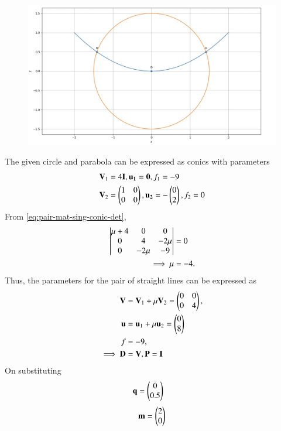 	\begin{figure}[!h]
		\centering
 \includegraphics[width=\columnwidth]{chapters/12/8/2/1/figs/conic.jpg}
		\caption{}
		\label{fig:12/8/2/1}
  	\end{figure}
The given circle and parabola can be expressed as conics with parameters 
\begin{align}
	\mathbf{V}_1&=4\mathbf{I},
\mathbf{u_1}=\mathbf{0},
f_1=-9
\\
	\mathbf{V}_2&=\begin{pmatrix}
1 & 0\\
0 & 0
\end{pmatrix},
\mathbf{u_2}= -\begin{pmatrix}
0\\
2
\end{pmatrix},
f_2=0
\end{align} 
	  From \eqref{eq:pair-mat-sing-conic-det},
\begin{align}
\begin{vmatrix}\mu+4 & 0 & 0\\ 
0 & 4 & -2\mu \\
0 & -2\mu & -9
\end{vmatrix} &= 0
\\
	\implies   \mu &= -4.
\end{align}
 Thus, the parameters for the pair of  straight lines can be expressed as 
 \begin{align}
	\mathbf{V} &= 
\mathbf{V}_1 + \mu\mathbf{V}_2
=\begin{pmatrix} 0 & 0 \\ 0 & 4\end{pmatrix},
\\
	\mathbf{u} &=
\mathbf{u}_1+\mu \mathbf{u}_2
	= \begin{pmatrix}
0\\
8
    \end{pmatrix}
\\
	f&=-9,
	\\
	\implies \mathbf{D} &= \mathbf{V}, \mathbf{P} = \mathbf{I}
    \end{align}
On substituting
\begin{align}
\mathbf{q} &= \begin{pmatrix}
0\\
0.5
\end{pmatrix} 
\end{align}
\begin{align}
\mathbf{m} = \begin{pmatrix}2 \\ 0\end{pmatrix}
\end{align}
